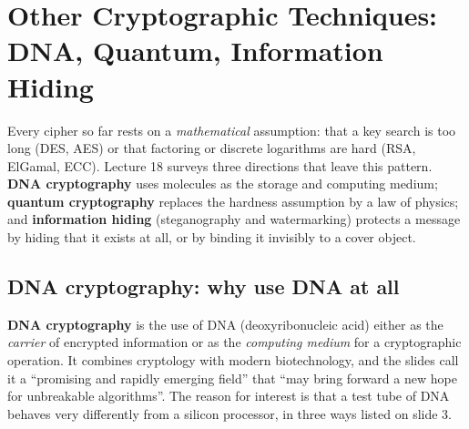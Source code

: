 \section{Other Cryptographic Techniques: DNA, Quantum, Information Hiding}\label{sec:othertech}
\providecommand{\otket}[1]{\lvert #1\rangle}
\providecommand{\otdup}[1]{\cellcolor{warn!15}#1}
\providecommand{\otsym}[1]{\ttx{#1}}
\usetikzlibrary{decorations.pathmorphing}

Every cipher so far rests on a \emph{mathematical} assumption: that a key search is too long (DES, AES) or that factoring or discrete logarithms are hard (RSA, ElGamal, ECC). Lecture 18 surveys three directions that leave this pattern. \textbf{DNA cryptography} uses molecules as the storage and computing medium; \textbf{quantum cryptography} replaces the hardness assumption by a law of physics; and \textbf{information hiding} (steganography and watermarking) protects a message by hiding that it exists at all, or by binding it invisibly to a cover object.

\subsection{DNA cryptography: why use DNA at all \new}

\textbf{DNA cryptography} is the use of DNA (deoxyribonucleic acid) either as the \emph{carrier} of encrypted information or as the \emph{computing medium} for a cryptographic operation. It combines cryptology with modern biotechnology, and the slides call it a ``promising and rapidly emerging field'' that ``may bring forward a new hope for unbreakable algorithms''. The reason for interest is that a test tube of DNA behaves very differently from a silicon processor, in three ways listed on slide 3.


